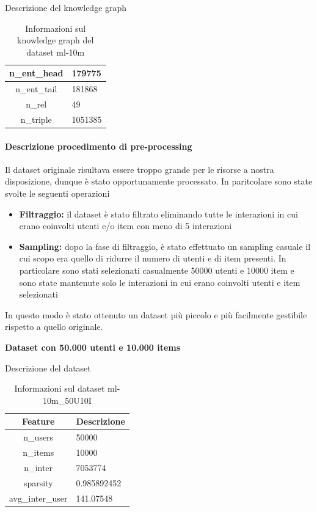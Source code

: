 \noindent Descrizione del knowledge graph
\begin{table}[H]
    \centering
    \footnotesize
    \begin{tabularx}{\textwidth}{|c|X|}
        \hline
        n\_ent\_head & 179775 \\
        \hline
        n\_ent\_tail & 181868 \\
        \hline
        n\_rel & 49 \\
        \hline
        n\_triple & 1051385 \\
        \hline
    \end{tabularx}
    \caption{Informazioni sul knowledge graph del dataset ml-10m}
    \label{tab:dataset_info}
\end{table}




\paragraph{Descrizione procedimento di pre-processing}


\noindent Il dataset originale risultava essere troppo grande per le risorse a nostra disposizione, dunque è stato opportunamente processato. In paritcolare sono state svolte le seguenti operazioni
\begin{itemize}
    \item \textbf{Filtraggio:} il dataset è stato filtrato eliminando tutte le interazioni in cui erano coinvolti utenti e/o item con meno di 5 interazioni
    \item \textbf{Sampling:} dopo la fase di filtraggio, è stato effettuato un sampling casuale il cui scopo era quello di ridurre il numero di utenti e di item presenti. In particolare sono stati selezionati casualmente 50000 utenti e 10000 item e sono state mantenute solo le interazioni in cui erano coinvolti utenti e item selezionati
\end{itemize}

\noindent In questo modo è stato ottenuto un dataset più piccolo e più facilmente gestibile rispetto a quello originale.

\noindent\textbf{Dataset con 50.000 utenti e 10.000 items}

\noindent Descrizione del dataset
\begin{table}[H]
    \centering
    \footnotesize
    \begin{tabularx}{\textwidth}{|c|X|}
        \hline
        \textbf{Feature} & \textbf{Descrizione} \\
        \hline
        n\_users & 50000 \\
        \hline
        n\_items & 10000 \\
        \hline
        n\_inter & 7053774 \\
        \hline
        sparsity & 0.985892452 \\
        \hline
        avg\_inter\_user & 141.07548 \\
        \hline
    \end{tabularx}
    \caption{Informazioni sul dataset ml-10m\_50U10I}
    \label{tab:dataset_info}
\end{table}


